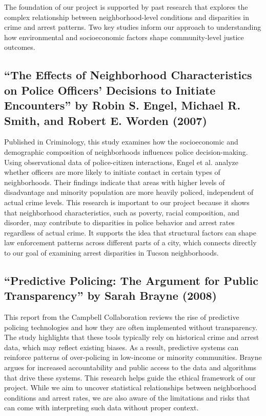 \documentclass{report}
\begin{document}
	The foundation of our project is supported by past research that explores the complex relationship between neighborhood-level conditions and disparities in crime and arrest patterns. Two key studies inform our approach to understanding how environmental and socioeconomic factors shape community-level justice outcomes.
	\subsection{“The Effects of Neighborhood Characteristics on Police Officers’ Decisions to Initiate Encounters” by Robin S. Engel, Michael R. Smith, and Robert E. Worden (2007)}
	Published in Criminology, this study examines how the socioeconomic and demographic composition of neighborhoods influences police decision-making. Using observational data of police-citizen interactions, Engel et al. analyze whether officers are more likely to initiate contact in certain types of neighborhoods. Their findings indicate that areas with higher levels of disadvantage and minority population are more heavily policed, independent of actual crime levels. This research is important to our project because it shows that neighborhood characteristics, such as poverty, racial composition, and disorder, may contribute to disparities in police behavior and arrest rates regardless of actual crime. It supports the idea that structural factors can shape law enforcement patterns across different parts of a city, which connects directly to our goal of examining arrest disparities in Tucson neighborhoods.
	
	\subsection{“Predictive Policing: The Argument for Public Transparency” by Sarah Brayne (2008)}
	This report from the Campbell Collaboration reviews the rise of predictive policing technologies and how they are often implemented without transparency. The study highlights that these tools typically rely on historical crime and arrest data, which may reflect existing biases. As a result, predictive systems can reinforce patterns of over-policing in low-income or minority communities. Brayne argues for increased accountability and public access to the data and algorithms that drive these systems. This research helps guide the ethical framework of our project. While we aim to uncover statistical relationships between neighborhood conditions and arrest rates, we are also aware of the limitations and risks that can come with interpreting such data without proper context.
	
\end{document}
